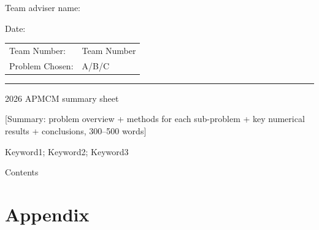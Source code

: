 \documentclass[ 12pt, a4paper]{ctexart}
\begin{document}
\noindent Team adviser name: \underline{}

\vspace{1.05em}
\hfill Date: \underline{\makebox[4cm]{}}

\newpage

\vspace{0.4em}
\begin{center}
\begin{tabular}{ll}
  Team Number: & Team Number \\
  Problem Chosen: & A/B/C \\
\end{tabular}
\end{center}
\vspace{1.35em}
\noindent\rule{\textwidth}{2pt}
\vspace{1.35em}

\begin{center}
  {\fontsize{12pt}{14.4pt} 2026 APMCM summary sheet}
\end{center}
\vspace{1.2em}

[Summary: problem overview + methods for each sub-problem + key numerical results + conclusions, 300--500 words]

\vspace{0.45em}

 Keyword1; Keyword2; Keyword3

\newpage

\begin{center}
  {\fontsize{17pt}{20.4pt} Contents}
\end{center}
\vspace{1em}
\tableofcontents
\newpage











\section*{Appendix}

\end{document}
